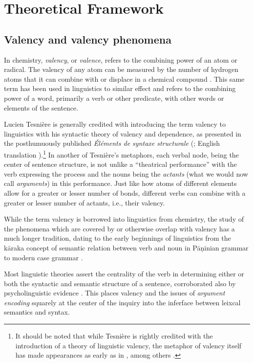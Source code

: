 \section{Theoretical Framework}

\subsection{Valency and valency phenomena}


In chemistry, \textit{valency}, or \textit{valence}, refers to the combining power of an atom or radical. The valency of any atom can be measured by the number of hydrogen atoms that it can combine with or displace in a chemical compound \citep{law2020a}. This same term has been used in linguistics to similar effect and refers to the combining power of a word, primarily a verb or other predicate, with other words or elements of the sentence. 

Lucien Tesnière is generally credited with introducing the term valency to linguistics with his syntactic theory of valency and dependence, as presented in the posthumuously published \textit{Éléments de syntaxe structurale} (\cite*{tesniere1959}; English translation \cite*{tesniere2015}).\footnote{
    It should be noted that while Tesnière is rightly credited with the introduction of a theory of linguistic valency, the metaphor of valency itself has made appearances as early as in \citet{peirce1897}, among others \citep{przepiorkowski2018}.
}
In another of Tesnière's metaphors, each verbal node, being the center of sentence structure, is not unlike a ``theatrical performance'' with the verb expressing the process and the nouns being the \textit{actants} (what we would now call \textit{arguments}) in this performance. Just like how atoms of different elements allow for a greater or lesser number of bonds, different verbs can combine with a greater or lesser number of actants, i.e., their valency.

While the term valency is borrowed into linguistics from chemistry, the study of the phenomena which are covered by or otherwise overlap with valency has a much longer tradition, dating to the early beginnings of linguistics from the kāraka concept of semantic relation between verb and noun \citep{ganeri2011a} in Pāṇinian grammar to modern case grammar \citep{fillmore1967}. 

Most linguistic theories assert the centrality of the verb in determining either or both the syntactic and semantic structure of a sentence, corroborated also by psycholinguistic evidence \citep{healy1970}. This places valency and the issues of \textit{argument encoding} squarely at the center of the inquiry into the inferface between leixcal semantics and syntax.

